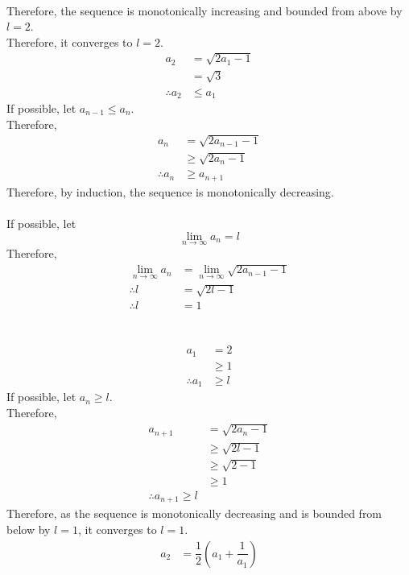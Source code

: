 \documentclass[fleqn, a4paper, 12pt, oneside]{amsart}
\theoremstyle{definition}
\theoremstyle{theorem}
\begin{document}
\begin{solution}
\begin{tasks}
			~\\
			Therefore, the sequence is monotonically increasing and bounded from above by $l = 2$.\\
			Therefore, it converges to $l = 2$.
		\task
			\begin{align*}
				a_2 &= \sqrt{2a_1 - 1}\\
				&= \sqrt{3}\\
				\therefore a_2 &\le a_1
			\end{align*}
			If possible, let $a_{n - 1} \le a_n$.\\
			Therefore,
			\begin{align*}
				a_n &= \sqrt{2 a_{n - 1} - 1}\\
				&\ge \sqrt{2 a_n - 1}\\
				\therefore a_n &\ge a_{n + 1}
			\end{align*}
			Therefore, by induction, the sequence is monotonically decreasing.\\
			~\\
			If possible, let 
			\begin{equation*}
				\lim\limits_{n \to \infty} a_n = l
			\end{equation*}
			Therefore,
			\begin{align*}
				\lim\limits_{n \to \infty} a_n &= \lim\limits_{n \to \infty} \sqrt{2 a_{n - 1} - 1}\\
				\therefore l &= \sqrt{2l - 1}\\
				\therefore l &= 1
			\end{align*}\\
			~\\
			\begin{align*}
				a_1 &= 2\\
				&\ge 1\\
				\therefore a_1 &\ge l
			\end{align*}
			If possible, let $a_{n} \ge l$.\\
			Therefore,
			\begin{align*}
				a_{n + 1} &= \sqrt{2 a_n - 1}\\
				&\ge \sqrt{2l - 1}\\
				&\ge \sqrt{2 - 1}\\
				&\ge 1\\
				\therefore a_{n + 1} \ge l
			\end{align*}
			Therefore, as the sequence is monotonically decreasing and is bounded from below by $l = 1$, it converges to $l = 1$.
		\task
			\begin{align*}
				a_2 &= \dfrac{1}{2} \left( a_1 + \dfrac{1}{a_1} \right)\\

\end{align*}
\end{tasks}
\end{solution}
\end{document}
